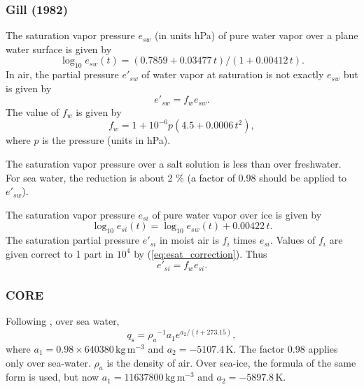 \documentclass[dvipdfmx]{elsarticle_mod}
\begin{document}
\subsubsection{Gill (1982)}

The saturation vapor pressure $e_{\mathit{sw}}$ (in units hPa) of pure water vapor over a plane water surface is given by
\begin{equation}
   \log_{10} e_{\mathit{sw}}(t) = (0.7859 + 0.03477\,t) / (1 + 0.00412\,t).
\end{equation}
In air, the partial pressure ${e'}_{\mathit{sw}}$ of water vapor at saturation is not exactly $e_{\mathit{sw}}$ but is given by
\begin{equation}
   {e'}_{\mathit{sw}} = f_{w} e_{\mathit{sw}}.
   \label{eq:partial_pressure_water}
\end{equation}
The value of $f_{w}$ is given by
\begin{equation}
   f_{w} = 1 + 10^{-6} p (4.5 + 0.0006 \, t^{2}),
   \label{eq:esat_correction}
\end{equation}
where $p$ is the pressure (units in hPa).

The saturation vapor pressure over a salt solution is less than over freshwater. For sea water, the reduction is about 2 \% (a factor of 0.98 should be applied to ${e'}_{\mathit{sw}}$).

The saturation vapor pressure $e_{\mathit{si}}$ of pure water vapor over ice is given by
\begin{equation}
   \log_{10} e_{\mathit{si}}(t) = \log_{10} e_{\mathit{sw}}(t) + 0.00422\,t.
   \label{eq:esat_ice_gill}
\end{equation}
The saturation partial pressure ${e'}_{\mathit{si}}$ in moist air is $f_{i}$ times $e_{\mathit{si}}$. Values of $f_{i}$ are given correct to 1 part in $10^{4}$ by (\ref{eq:esat_correction}). Thus
\begin{equation}
   {e'}_{\mathit{si}} = f_{w} e_{\mathit{si}}.
   \label{eq:partial_pressure_ice}
\end{equation}


\subsubsection{CORE}

Following \citet{Large_and_Yeager_2004}, over sea water,
\begin{equation}
q_{\mathrm{s}} = {\rho_a}^{-1} a_1 e^{a_2/(t+273.15)},
\label{eq:qsat_core}
\end{equation}
where $a_1 = 0.98 \times 640380 \,\mathrm{kg}\,\mathrm{m}^{-3}$ and $a_2 = -5107.4 \,\mathrm{K}$. The factor 0.98 applies only over sea-water. $\rho_a$ is the density of air. Over sea-ice, the formula of the same form is used, but now $a_1 = 11637800 \,\mathrm{kg}\,\mathrm{m}^{-3}$ and $a_2 = -5897.8 \,\mathrm{K}$. 
\end{document}
